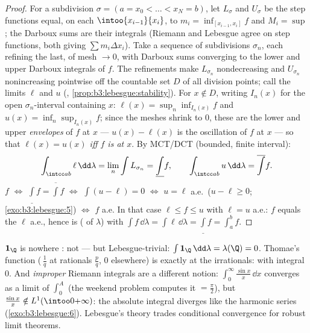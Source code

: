 \begin{proof}
For a subdivision $\sigma = (a = x_0 < \dots < x_N = b)$, let
$L_\sigma$ and $U_\sigma$ be the step functions equal, on each
$\intoo{x_{i-1}}{x_i}$, to $m_i = \inf_{[x_{i-1}, x_i]}f$ and
$M_i = \sup$; the Darboux sums are their integrals (Riemann and
Lebesgue agree on step functions, both giving $\sum
m_i\Delta x_i$). Take a sequence of subdivisions $\sigma_n$,
each refining the last, of mesh $\to 0$, with Darboux sums
converging to the lower and upper Darboux integrals of $f$.
The refinements make $L_{\sigma_n}$ nondecreasing and
$U_{\sigma_n}$ nonincreasing pointwise off the countable set
$D$ of all division points; call the limits $\ell$ and $u$
(, \cref{prop:b3:lebesgue:stability}). For $x \notin
D$, writing $I_n(x)$ for the open $\sigma_n$-interval
containing $x$: $\ell(x) = \sup_n\inf_{I_n(x)}f$ and $u(x) =
\inf_n\sup_{I_n(x)}f$; since the meshes shrink to $0$, these
are the lower and upper \emph{envelopes} of $f$ at $x$
--- $u(x) - \ell(x)$ is the oscillation of $f$ at $x$ --- so
that \emph{$\ell(x) = u(x)$ iff $f$ is  at $x$}. By MCT/DCT (bounded, finite interval):
\[
\int_{\intcc ab}\ell\,\dd\lambda = \lim_n\int L_{\sigma_n}
= \underline{\int}f,
\qquad
\int_{\intcc ab}u\,\dd\lambda = \overline{\int}f .
\]
$f$  $\iff$ $\underline\int f =
\overline\int f$ $\iff$ $\int(u - \ell) = 0$ $\iff$ $u = \ell$
a.e.\ ($u - \ell \geq 0$; \cref{exo:b3:lebesgue:5}) $\iff$ $f$
 a.e. In that case $\ell \leq f \leq u$ with $\ell =
u$ a.e.: $f$ equals the  $\ell$ a.e., hence is
 ( of $\lambda$) with
$\int f\,\dd\lambda = \int\ell\,\dd\lambda = \underline\int f =
\int_a^bf$.
\end{proof}

\begin{example}\label{ex:b3:lebesgue:riemannexamples}
$\mathbf 1_\Q$ is nowhere : not 
--- but Lebesgue-trivial: $\int\mathbf 1_\Q\,\dd\lambda =
\lambda(\Q) = 0$. Thomae's function (\,$\frac1q$ at rationals
$\frac pq$, $0$ elsewhere) is  exactly at the
irrationals:  with integral $0$. And
\emph{improper} Riemann integrals are a different notion:
$\int_0^\infty\frac{\sin x}x\,\dd x$ converges as a limit of
$\int_0^A$ (the weekend problem computes it $= \frac\pi2$),
but $\frac{\sin x}x \notin L^1(\intoo0{+\infty})$: the absolute
integral diverges like the harmonic series
(\cref{exo:b3:lebesgue:6}). Lebesgue's theory trades
conditional convergence for robust limit theorems.
\end{example}

